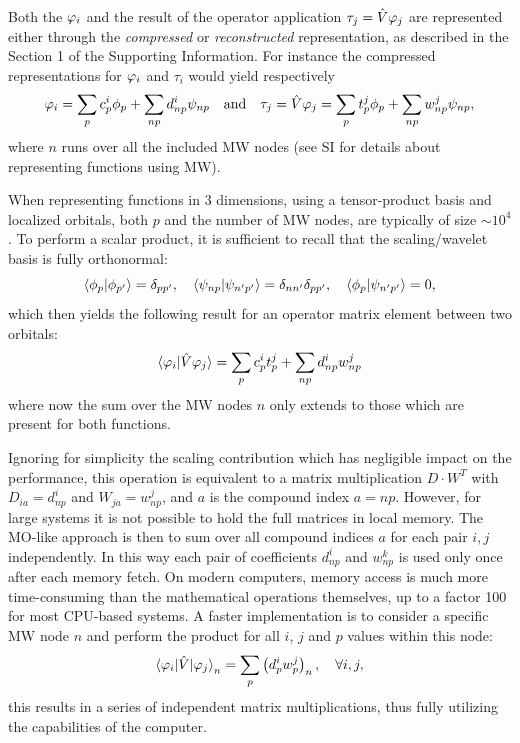 \documentclass[journal=jctcce, manuscript=article]{achemso}
\begin{document}
Both the $\varphi_i$
and the result of the operator application $\tau_j = \hat{V} \varphi_j$
are represented either through the \emph{compressed} or \emph{reconstructed} representation, as described in the Section 1 of the Supporting Information. For instance the compressed representations for $\varphi_i$ and $\tau_i$ would yield respectively
\begin{equation}\label{eq:compressed_orb}
  \varphi_i = \sum_{p} c^i_p \phi_p + \sum_{np} d^i_{np} \psi_{np} \quad\text{and}\quad \tau_j = {\hat V} \varphi_j = \sum_{p} t^j_p \phi_p + \sum_{np} w^j_{np} \psi_{np},
\end{equation}
where $n$ 
runs over all the included \ac{MW} nodes (see \ac{SI} for details about representing functions using \ac{MW}).

When representing functions in 3 dimensions,
using a tensor-product basis and localized orbitals, both $p$ and the number of \ac{MW} nodes, are typically of size $\sim 10^4$. 
To perform a scalar product, it is sufficient to recall that the scaling/wavelet basis is fully orthonormal:
\begin{equation}\label{eq:wavelet_othrogonality}
  \braket{\phi_{p} | \phi_{p'}}  = \delta_{pp'}, \quad   \braket{\psi_{np} | \psi_{n'p'}}  = \delta_{nn'}\delta_{pp'}, \quad   \braket{\phi_{p} | \psi_{n'p'}}  = 0, 
\end{equation}
which then yields the following result for an operator matrix element between two orbitals:
\begin{equation}
  \braket{\varphi_i|{\hat V} \varphi_j} = \sum_{p} c^i_{p} t^j_{p} + \sum_{np} d^i_{np} w^j_{np}
\end{equation}
where now the sum over the \ac{MW} nodes $n$ only extends to those which are present for both functions.

Ignoring for simplicity the scaling contribution which has negligible impact on the performance, this operation is equivalent to a matrix multiplication $D \cdot W^T$ with $D_{ia} = d^i_{np}$ and $W_{ja} = w^j_{np}$, and $a$ is the compound index $a=np$. However, for large systems it is not possible to hold the full matrices in local memory.
The \ac{MO}-like approach is then to sum over all compound indices $a$ for each pair $i,j$ independently. In this way each pair of coefficients $d^i_{np}$ and $w^k_{np}$ is used only once after each memory fetch. On modern computers, memory access is much more time-consuming than the mathematical operations themselves, up to a factor 100 for most CPU-based systems. A faster implementation is to consider a specific \ac{MW} node $n$ and perform the product for all $i$, $j$ and $p$ values within this node:
\begin{equation}\label{equ:sum}
  \braket{\varphi_i | {\hat V} |\varphi_j}_{n} 
  = \sum_{p} \left(d^i_{p} w^j_{p}\right)_{n}, \quad\forall i,j,
\end{equation}
this results in a series of independent matrix multiplications, thus fully utilizing the capabilities of the computer. 
\end{document}

